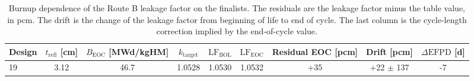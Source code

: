 \begin{table}[htbp]
  \centering
  \caption{Burnup dependence of the Route B leakage factor on the finalists. The residuals are the leakage factor minus the table value, in pcm. The drift is the change of the leakage factor from beginning of life to end of cycle. The last column is the cycle-length correction implied by the end-of-cycle value.}
  \label{tab:kt-burnup}
  \begin{tabular}{lcccccccc}
    \toprule
    Design & $t_\mathrm{refl}$ [cm] & $B_\mathrm{EOC}$ [MWd/kgHM] & $k_\mathrm{target}$ & $\mathrm{LF}_\mathrm{BOL}$ & $\mathrm{LF}_\mathrm{EOC}$ & Residual EOC [pcm] & Drift [pcm] & $\Delta\mathrm{EFPD}$ [d] \\
    \midrule
    19 & 3.12 & 46.7 & 1.0528 & 1.0530 & 1.0532 & +35 & +22 $\pm$ 137 & -7 \\
    \bottomrule
  \end{tabular}
\end{table}
